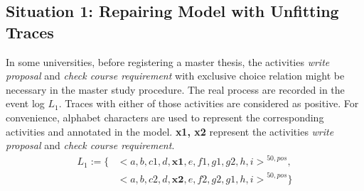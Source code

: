 \subsection{Situation 1: \small{Repairing Model with Unfitting Traces}} %
In some universities, before registering a master thesis, the activities \emph{write proposal} and \emph{check course requirement} with exclusive choice relation might be necessary in the master study procedure. The real process are recorded in the event log $L_1$. Traces with either of those activities are considered as positive. For convenience, alphabet characters are used to represent the corresponding activities and annotated in the model. \textbf{x1, x2} represent the activities \emph{write proposal} and \emph{check course requirement}.
		\begin{align*}
		L_1:= \{ &  {<a,b,c1,d,\textbf{x1},e,f1,g1,g2,h,i>}^{50, pos}, \\   
		             &{<a,b,c2,d,\textbf{x2}, e, f2,g2,g1,h,i>}^{50,pos} \}
		\end{align*}
